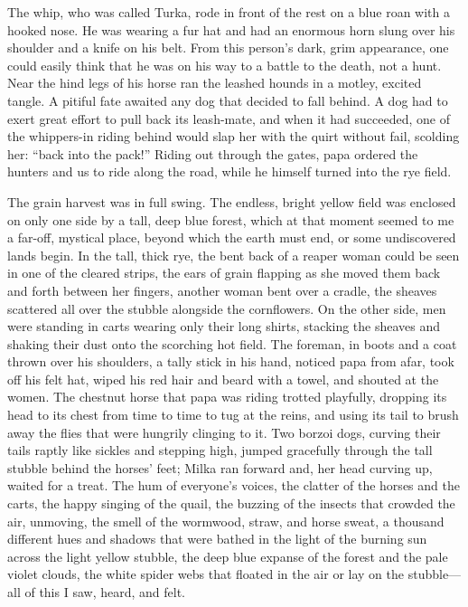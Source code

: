 The whip, who was called Turka, rode in front of the rest on a blue roan with a hooked nose. He was wearing a fur hat and had an enormous horn slung over his shoulder and a knife on his belt. From this person's dark, grim appearance, one could easily think that he was on his way to a battle to the death, not a hunt. Near the hind legs of his horse ran the leashed hounds in a motley, excited tangle. A pitiful fate awaited any dog that decided to fall behind. A dog had to exert great effort to pull back its leash-mate, and when it had succeeded, one of the whippers-in riding behind would slap her with the quirt without fail, scolding her: ``back into the pack!'' Riding out through the gates, papa ordered the hunters and us to ride along the road, while he himself turned into the rye field.

The grain harvest was in full swing. The endless, bright yellow field was enclosed on only one side by a tall, deep blue forest, which at that moment seemed to me a far-off, mystical place, beyond which the earth must end, or some undiscovered lands begin. In the tall, thick rye, the bent back of a reaper woman could be seen in one of the cleared strips, the ears of grain flapping as she moved them back and forth between her fingers, another woman bent over a cradle, the sheaves scattered all over the stubble alongside the cornflowers. On the other side, men were standing in carts wearing only their long shirts, stacking the sheaves and shaking their dust onto the scorching hot field. The foreman, in boots and a coat thrown over his shoulders, a tally stick in his hand, noticed papa from afar, took off his felt hat, wiped his red hair and beard with a towel, and shouted at the women. The chestnut horse that papa was riding trotted playfully, dropping its head to its chest from time to time to tug at the reins, and using its tail to brush away the flies that were hungrily clinging to it. Two borzoi dogs, curving their tails raptly like sickles and stepping high, jumped gracefully through the tall stubble behind the horses' feet; Milka ran forward and, her head curving up, waited for a treat. The hum of everyone's voices, the clatter of the horses and the carts, the happy singing of the quail, the buzzing of the insects that crowded the air, unmoving, the smell of the wormwood, straw, and horse sweat, a thousand different hues and shadows that were bathed in the light of the burning sun across the light yellow stubble, the deep blue expanse of the forest and the pale violet clouds, the white spider webs that floated in the air or lay on the stubble---all of this I saw, heard, and felt.

